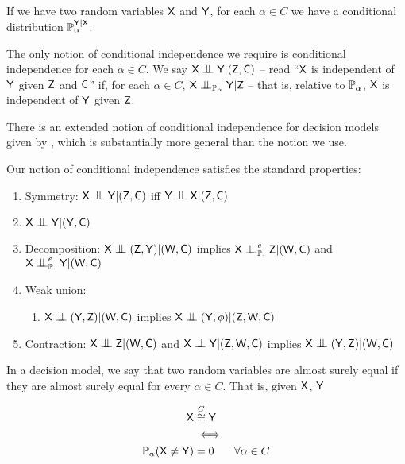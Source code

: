 If we have two random variables $\mathsf{X}$ and $\mathsf{Y}$, for each $\alpha\in C$ we have a conditional distribution $\mathbb{P}^{\mathsf{Y}|\mathsf{X}}_\alpha$.

The only notion of conditional independence we require is conditional independence for each $\alpha\in C$. We say $\RV{X}\CI \RV{Y} | (\RV{Z}, \RV{C})$ -- read ``$\mathsf{X}$ is independent of $\mathsf{Y}$ given $\mathsf{Z}$ and $\mathsf{C}$'' if, for each $\alpha\in C$, $\RV{X} \CI_{\prob{P}_\alpha} \RV{Y} | \RV{Z}$ -- that is, relative to $\mathbb{P}_\alpha$, $\mathsf{X}$ is independent of $\mathsf{Y}$ given $\mathsf{Z}$.

There is an extended notion of conditional independence for decision models given by \citet{constantinou_extended_2017}, which is substantially more general than the notion we use.

Our notion of conditional independence satisfies the standard properties:

\begin{enumerate}
    \item Symmetry: $\RV{X}\CI \RV{Y}|(\RV{Z}, \RV{C})$ iff $\RV{Y}\CI \RV{X}|(\RV{Z},\RV{C})$
    \item $\RV{X}\CI \RV{Y}| (\RV{Y}, \RV{C})$
    \item Decomposition: $\RV{X}\CI (\RV{Z}, \RV{Y})|(\RV{W}, \RV{C})$ implies $\RV{X}\CI_{\prob{P}_{\cdot}}^e\RV{Z}|(\RV{W}, \RV{C})$ and $\RV{X}\CI_{\prob{P}_{\cdot}}^e\RV{Y}|(\RV{W}, \RV{C})$
    \item Weak union:
    \begin{enumerate}
     	\item $\RV{X}\CI (\RV{Y}, \RV{Z})|(\RV{W}, \RV{C})$ implies $\RV{X}\CI (\RV{Y},\phi)|(\RV{Z},\RV{W}, \RV{C})$
     \end{enumerate} 
    \item Contraction: $\RV{X}\CI \RV{Z}|(\RV{W}, \RV{C})$ and $\RV{X}\CI \RV{Y}|(\RV{Z},\RV{W}, \RV{C})$ implies $\RV{X}\CI(\RV{Y},\RV{Z})|(\RV{W}, \RV{C})$
\end{enumerate} 

In a decision model, we say that two random variables are almost surely equal if they are almost surely equal for every $\alpha\in C$. That is, given $\mathsf{X}$, $\mathsf{Y}$

\begin{align}
	\mathsf{X} &\overset{C}{\cong} \mathsf{Y}\\
	&\iff\\
	\mathbb{P}_\alpha(\mathsf{X}\neq \mathsf{Y}) &= 0 &\forall \alpha\in C
\end{align}

